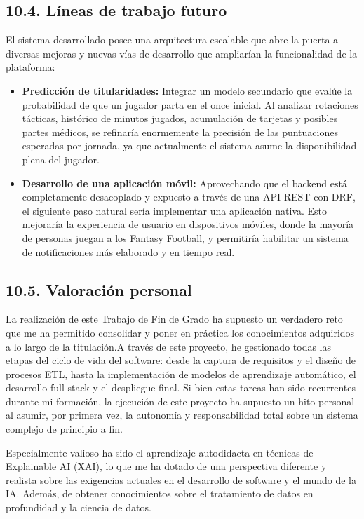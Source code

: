 \subsection{10.4. Líneas de trabajo futuro}

El sistema desarrollado posee una arquitectura escalable que abre la puerta a diversas mejoras y nuevas vías de desarrollo que ampliarían la funcionalidad de la plataforma:
\begin{itemize}
    \item \textbf{Predicción de titularidades:} Integrar un modelo secundario que evalúe la probabilidad de que un jugador parta en el once inicial. Al analizar rotaciones tácticas, histórico de minutos jugados, acumulación de tarjetas y posibles partes médicos, se refinaría enormemente la precisión de las puntuaciones esperadas por jornada, ya que actualmente el sistema asume la disponibilidad plena del jugador.
    \item \textbf{Desarrollo de una aplicación móvil:} Aprovechando que el backend está completamente desacoplado y expuesto a través de una API REST con DRF, el siguiente paso natural sería implementar una aplicación nativa. Esto mejoraría la experiencia de usuario en dispositivos móviles, donde la mayoría de personas juegan a los Fantasy Football, y permitiría habilitar un sistema de notificaciones más elaborado y en tiempo real.
\end{itemize}

\subsection{10.5. Valoración personal}

La realización de este Trabajo de Fin de Grado ha supuesto un verdadero reto que me ha permitido consolidar y poner en práctica los conocimientos adquiridos a lo largo de la titulación.A través de este proyecto, he gestionado todas las etapas del ciclo de vida del software: desde la captura de requisitos y el diseño de procesos ETL, hasta la implementación de modelos de aprendizaje automático, el desarrollo full-stack y el despliegue final. Si bien estas tareas han sido recurrentes durante mi formación, la ejecución de este proyecto ha supuesto un hito personal al asumir, por primera vez, la autonomía y responsabilidad total sobre un sistema complejo de principio a fin.

Especialmente valioso ha sido el aprendizaje autodidacta en técnicas de Explainable AI (XAI), lo que me ha dotado de una perspectiva diferente y realista sobre las exigencias actuales en el desarrollo de software y el mundo de la IA. Además, de obtener conocimientos sobre el tratamiento de datos en profundidad y la ciencia de datos.